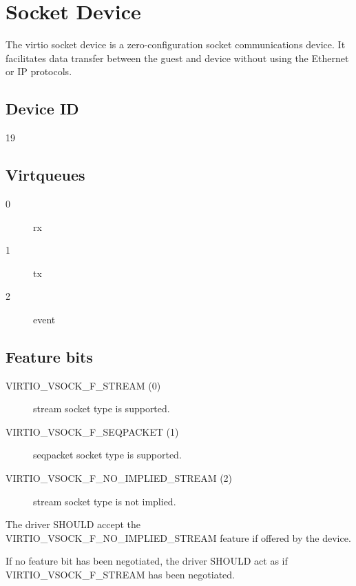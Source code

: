 \section{Socket Device}\label{sec:Device Types / Socket Device}

The virtio socket device is a zero-configuration socket communications device.
It facilitates data transfer between the guest and device without using the
Ethernet or IP protocols.

\subsection{Device ID}\label{sec:Device Types / Socket Device / Device ID}
  19

\subsection{Virtqueues}\label{sec:Device Types / Socket Device / Virtqueues}
\begin{description}
\item[0] rx
\item[1] tx
\item[2] event
\end{description}

\subsection{Feature bits}\label{sec:Device Types / Socket Device / Feature bits}

\begin{description}
\item[VIRTIO_VSOCK_F_STREAM (0)] stream socket type is supported.
\item[VIRTIO_VSOCK_F_SEQPACKET (1)] seqpacket socket type is supported.
\item[VIRTIO_VSOCK_F_NO_IMPLIED_STREAM (2)] stream socket type is not implied.
\end{description}


The driver SHOULD accept the VIRTIO_VSOCK_F_NO_IMPLIED_STREAM feature if
offered by the device.

If no feature bit has been negotiated, the driver SHOULD act as if
VIRTIO_VSOCK_F_STREAM has been negotiated.


